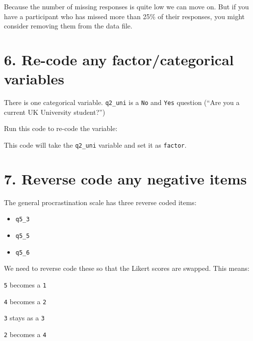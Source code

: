 \documentclass[
]{book}
\newenvironment{Shaded}{\begin{snugshade}}{\end{snugshade}}
\newcommand{\FunctionTok}[1]{\textcolor[rgb]{0.13,0.29,0.53}{\textbf{#1}}}
\newcommand{\NormalTok}[1]{#1}
\newcommand{\OtherTok}[1]{\textcolor[rgb]{0.56,0.35,0.01}{#1}}
\newcommand{\SpecialCharTok}[1]{\textcolor[rgb]{0.81,0.36,0.00}{\textbf{#1}}}
\providecommand{\tightlist}{%
  \setlength{\itemsep}{0pt}\setlength{\parskip}{0pt}}
\let\oldsection\section
\renewcommand{\section}{\needspace{5\baselineskip}\oldsection}
\begin{document}
Because the number of missing responses is quite low we can move on.
But if you have a participant who has missed more than 25\% of their responses, you might consider removing them from the data file.

\section{\texorpdfstring{\textbf{6. Re-code any factor/categorical variables}}{6. Re-code any factor/categorical variables}}\label{re-code-any-factorcategorical-variables}

There is one categorical variable.
\texttt{q2\_uni} is a \texttt{No} and \texttt{Yes} question (``Are you a current UK University student?'')

Run this code to re-code the variable:

\begin{Shaded}
\end{Shaded}

This code will take the \texttt{q2\_uni} variable and set it as \texttt{factor}.

\section{\texorpdfstring{\textbf{7. Reverse code any negative items}}{7. Reverse code any negative items}}\label{reverse-code-any-negative-items}

The general procrastination scale has three reverse coded items:

\begin{itemize}
\tightlist
\item
  \texttt{q5\_3}
\item
  \texttt{q5\_5}
\item
  \texttt{q5\_6}
\end{itemize}

We need to reverse code these so that the Likert scores are swapped.
This means:

\texttt{5} becomes a \texttt{1}

\texttt{4} becomes a \texttt{2}

\texttt{3} stays as a \texttt{3}

\texttt{2} becomes a \texttt{4}
\end{document}
